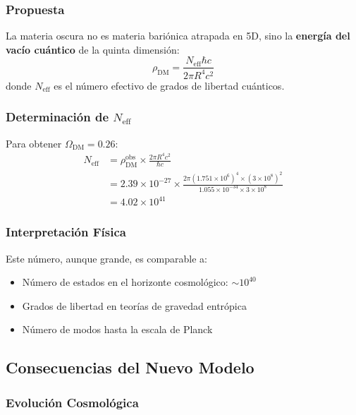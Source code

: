 \documentclass[12pt,a4paper]{article}
\begin{document}
\subsubsection{Propuesta}

La materia oscura no es materia bariónica atrapada en 5D, sino la \textbf{energía del vacío cuántico} de la quinta dimensión:
\begin{equation}
\rho_\mathrm{DM} = \frac{N_\mathrm{eff} \hbar c}{2\pi R^4 c^2}
\end{equation}
donde $N_\mathrm{eff}$ es el número efectivo de grados de libertad cuánticos.

\subsubsection{Determinación de $N_\mathrm{eff}$}

Para obtener $\Omega_\mathrm{DM} = 0.26$:
\begin{align}
N_\mathrm{eff} &= \rho_\mathrm{DM}^\mathrm{obs} \times \frac{2\pi R^4 c^2}{\hbar c} \\
&= 2.39 \times 10^{-27} \times \frac{2\pi (1.751 \times 10^6)^4 \times (3 \times 10^8)^2}{1.055 \times 10^{-34} \times 3 \times 10^8} \\
&= 4.02 \times 10^{41}
\end{align}

\subsubsection{Interpretación Física}

Este número, aunque grande, es comparable a:
\begin{itemize}
    \item Número de estados en el horizonte cosmológico: $\sim 10^{40}$
    \item Grados de libertad en teorías de gravedad entrópica
    \item Número de modos hasta la escala de Planck
\end{itemize}

\subsection{Consecuencias del Nuevo Modelo}

\subsubsection{Evolución Cosmológica}
\end{document}
